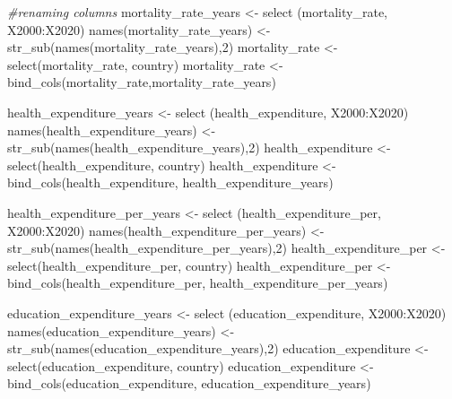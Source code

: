 \documentclass[
]{article}
\newenvironment{Shaded}{\begin{snugshade}}{\end{snugshade}}
\newcommand{\CommentTok}[1]{\textcolor[rgb]{0.56,0.35,0.01}{\textit{#1}}}
\newcommand{\DecValTok}[1]{\textcolor[rgb]{0.00,0.00,0.81}{#1}}
\newcommand{\FunctionTok}[1]{\textcolor[rgb]{0.00,0.00,0.00}{#1}}
\newcommand{\NormalTok}[1]{#1}
\newcommand{\OtherTok}[1]{\textcolor[rgb]{0.56,0.35,0.01}{#1}}
\newcommand{\SpecialCharTok}[1]{\textcolor[rgb]{0.00,0.00,0.00}{#1}}
\newcommand{\StringTok}[1]{\textcolor[rgb]{0.31,0.60,0.02}{#1}}
\begin{document}
\begin{Shaded}
\begin{Highlighting}[]
\CommentTok{\#renaming columns}
\NormalTok{mortality\_rate\_years }\OtherTok{\textless{}{-}} \FunctionTok{select}\NormalTok{ (mortality\_rate, }\StringTok{\textquotesingle{}X2000\textquotesingle{}}\SpecialCharTok{:}\StringTok{\textquotesingle{}X2020\textquotesingle{}}\NormalTok{)}
\FunctionTok{names}\NormalTok{(mortality\_rate\_years) }\OtherTok{\textless{}{-}} \FunctionTok{str\_sub}\NormalTok{(}\FunctionTok{names}\NormalTok{(mortality\_rate\_years),}\DecValTok{2}\NormalTok{)}
\NormalTok{mortality\_rate }\OtherTok{\textless{}{-}} \FunctionTok{select}\NormalTok{(mortality\_rate, country)}
\NormalTok{mortality\_rate }\OtherTok{\textless{}{-}} \FunctionTok{bind\_cols}\NormalTok{(mortality\_rate,mortality\_rate\_years)}

\NormalTok{health\_expenditure\_years }\OtherTok{\textless{}{-}} \FunctionTok{select}\NormalTok{ (health\_expenditure, }\StringTok{\textquotesingle{}X2000\textquotesingle{}}\SpecialCharTok{:}\StringTok{\textquotesingle{}X2020\textquotesingle{}}\NormalTok{)}
\FunctionTok{names}\NormalTok{(health\_expenditure\_years) }\OtherTok{\textless{}{-}} \FunctionTok{str\_sub}\NormalTok{(}\FunctionTok{names}\NormalTok{(health\_expenditure\_years),}\DecValTok{2}\NormalTok{)}
\NormalTok{health\_expenditure }\OtherTok{\textless{}{-}} \FunctionTok{select}\NormalTok{(health\_expenditure, country)}
\NormalTok{health\_expenditure }\OtherTok{\textless{}{-}} \FunctionTok{bind\_cols}\NormalTok{(health\_expenditure, health\_expenditure\_years)}

\NormalTok{health\_expenditure\_per\_years }\OtherTok{\textless{}{-}} \FunctionTok{select}\NormalTok{ (health\_expenditure\_per, }\StringTok{\textquotesingle{}X2000\textquotesingle{}}\SpecialCharTok{:}\StringTok{\textquotesingle{}X2020\textquotesingle{}}\NormalTok{)}
\FunctionTok{names}\NormalTok{(health\_expenditure\_per\_years) }\OtherTok{\textless{}{-}} \FunctionTok{str\_sub}\NormalTok{(}\FunctionTok{names}\NormalTok{(health\_expenditure\_per\_years),}\DecValTok{2}\NormalTok{)}
\NormalTok{health\_expenditure\_per }\OtherTok{\textless{}{-}} \FunctionTok{select}\NormalTok{(health\_expenditure\_per, country)}
\NormalTok{health\_expenditure\_per }\OtherTok{\textless{}{-}} \FunctionTok{bind\_cols}\NormalTok{(health\_expenditure\_per, health\_expenditure\_per\_years)}

\NormalTok{education\_expenditure\_years }\OtherTok{\textless{}{-}} \FunctionTok{select}\NormalTok{ (education\_expenditure, }\StringTok{\textquotesingle{}X2000\textquotesingle{}}\SpecialCharTok{:}\StringTok{\textquotesingle{}X2020\textquotesingle{}}\NormalTok{)}
\FunctionTok{names}\NormalTok{(education\_expenditure\_years) }\OtherTok{\textless{}{-}} \FunctionTok{str\_sub}\NormalTok{(}\FunctionTok{names}\NormalTok{(education\_expenditure\_years),}\DecValTok{2}\NormalTok{)}
\NormalTok{education\_expenditure }\OtherTok{\textless{}{-}} \FunctionTok{select}\NormalTok{(education\_expenditure, country)}
\NormalTok{education\_expenditure }\OtherTok{\textless{}{-}} \FunctionTok{bind\_cols}\NormalTok{(education\_expenditure, education\_expenditure\_years)}


\end{Highlighting}
\end{Shaded}
\end{document}
